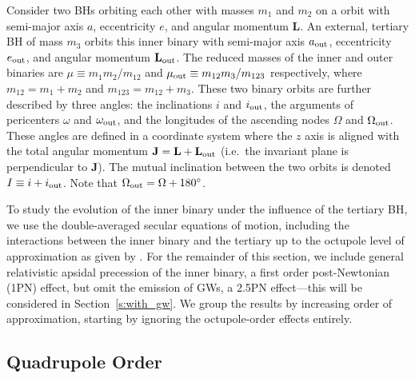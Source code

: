 \documentclass[
        fleqn,
        usenatbib,
    ]{mnras}
\newcommand*{\bm}[1]{\mathbf{#1}}
\begin{document}
Consider two BHs orbiting each other with masses $m_1$ and $m_2$ on a orbit with
semi-major axis $a$, eccentricity $e$, and angular momentum $\bm{L}$. An external,
tertiary BH of mass $m_3$ orbits this inner binary with semi-major axis $a_{\rm
out}$, eccentricity $e_{\rm out}$, and angular momentum $\bm{L}_{\rm out}$. The
reduced masses of the inner and outer binaries are $\mu \equiv m_1m_2 / m_{12}$
and $\mu_{\rm out} \equiv m_{12} m_3 / m_{123}$ respectively, where $m_{12} =
m_1 + m_2$ and $m_{123} = m_{12} + m_3$. These two binary orbits are further
described by three angles: the inclinations $i$ and $i_{\rm out}$, the arguments
of pericenters $\omega$ and $\omega_{\rm out}$, and the longitudes of the
ascending nodes $\Omega$ and $\Omega_{\rm out}$. These angles are defined in a
coordinate system where the $z$ axis is aligned with the total angular momentum
$\bm{J} = \bm{L} + \bm{L}_{\rm out}$ (i.e.\ the invariant plane is perpendicular
to $\bm{J}$). The mutual inclination between the two orbits is denoted $I \equiv
i + i_{\rm out}$. Note that $\Omega_{\rm out} = \Omega + 180^\circ$.

To study the evolution of the inner binary under the influence of the tertiary
BH, we use the double-averaged secular equations of motion, including the
interactions between the inner binary and the tertiary up to the octupole level
of approximation as given by \citet{LML15}. For the remainder of this section,
we include general relativistic apsidal precession of the inner binary, a first
order post-Newtonian (1PN) effect, but omit the emission of GWs, a 2.5PN
effect---this will be considered in Section~\ref{s:with_gw}. We group the
results by increasing order of approximation, starting by ignoring the
octupole-order effects entirely.

\subsection{Quadrupole Order}
\end{document}

